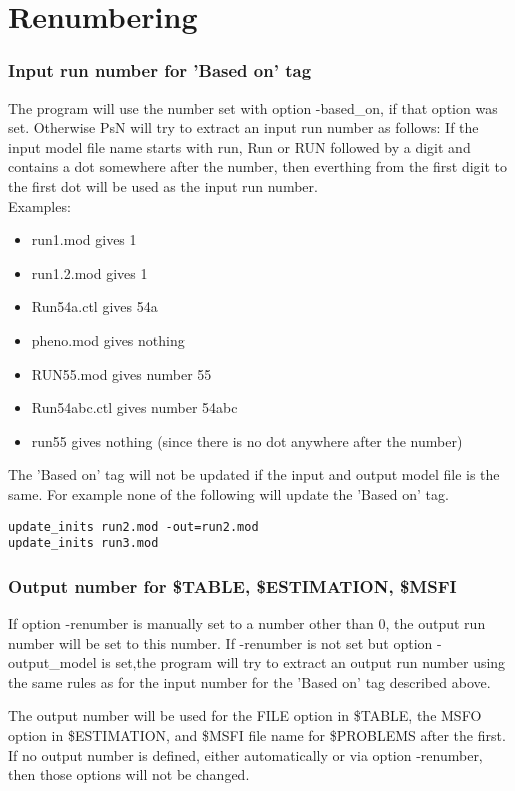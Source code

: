 \section{Renumbering}
\subsubsection*{Input run number for 'Based on' tag}
The program will use the number set with option -based\_on, if that option was set. Otherwise PsN will try to extract an input run number as follows: If the input model file name starts with run, Run or RUN followed by a digit and contains a dot somewhere after the number, then everthing from the first digit to the first dot will be used as the input run number.\\
Examples:
\begin{itemize}
\item run1.mod gives 1
\item run1.2.mod gives 1
\item Run54a.ctl gives 54a
\item pheno.mod gives nothing
\item RUN55.mod gives number 55
\item Run54abc.ctl gives number 54abc
\item run55 gives nothing (since there is no dot anywhere after the number)
\end{itemize}
The 'Based on' tag will not be updated if the input and output model file is the same. For example none of the following will update the 'Based on' tag.
\begin{verbatim}
update_inits run2.mod -out=run2.mod
update_inits run3.mod
\end{verbatim}

\subsubsection*{Output number for \$TABLE, \$ESTIMATION, \$MSFI}
If option -renumber is manually set to a number other than 0, the output run number will be set to this number. If -renumber is not set but option -output\_model is set,the program will try to extract an output run number using the same rules as for the input number for the 'Based on' tag described above.

The output number will be used for the FILE option in \$TABLE, the MSFO option in \$ESTIMATION, and \$MSFI file name for \$PROBLEMS after the first. If no output number is defined, either automatically or via option -renumber, then those options will not be changed.

